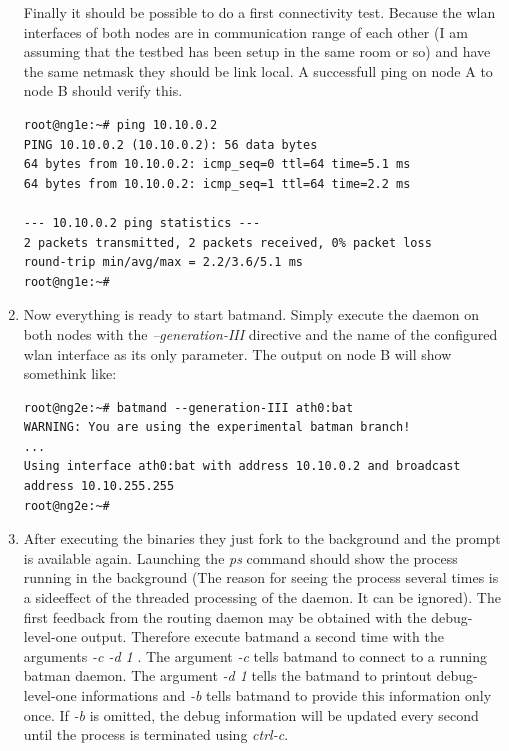 \documentclass[11pt]{article}
\begin{document}
\begin{enumerate}
Finally it should be possible to do a first connectivity test.
%
Because the wlan interfaces of both nodes are in communication range of each other (I am assuming that the testbed has been setup in the same room or so) and have the same netmask they should be link local. A successfull ping on node A to node B should verify this.
\begin{small} \begin{verbatim}
root@ng1e:~# ping 10.10.0.2
PING 10.10.0.2 (10.10.0.2): 56 data bytes
64 bytes from 10.10.0.2: icmp_seq=0 ttl=64 time=5.1 ms
64 bytes from 10.10.0.2: icmp_seq=1 ttl=64 time=2.2 ms

--- 10.10.0.2 ping statistics ---
2 packets transmitted, 2 packets received, 0% packet loss
round-trip min/avg/max = 2.2/3.6/5.1 ms
root@ng1e:~#
\end{verbatim} \end{small}

\item Now everything is ready to start batmand. Simply execute the daemon on both nodes with the \emph{--generation-III} directive and the name of the configured wlan interface as its only parameter. The output on node B will show somethink like:

\begin{small} \begin{verbatim}
root@ng2e:~# batmand --generation-III ath0:bat
WARNING: You are using the experimental batman branch!
...
Using interface ath0:bat with address 10.10.0.2 and broadcast address 10.10.255.255
root@ng2e:~#
\end{verbatim} \end{small}

\item After executing the binaries they just fork to the background and the prompt is available again.
Launching the \emph{ps} command should show the process running in the background (The reason for seeing the process several times is a sideeffect of the threaded processing of the daemon. It can be ignored).
The first feedback from the routing daemon may be obtained with the debug-level-one output.
Therefore execute batmand a second time with the arguments \emph{ -c -d 1 }.
The argument \emph{-c} tells batmand to connect to a running batman daemon.
The argument \emph{-d 1} tells the batmand to printout debug-level-one informations and
\emph{-b} tells batmand to provide this information only once.
If \emph{-b} is omitted, the debug information will be updated every second until the process is terminated using \emph{ctrl-c}.


\end{enumerate}
\end{document}
